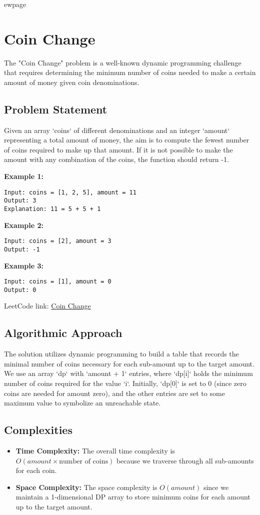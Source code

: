 
ewpage
\chapter{Coin Change}
\label{chap:Coin_Change}
The "Coin Change" problem is a well-known dynamic programming challenge that requires determining the minimum number of coins needed to make a certain amount of money given coin denominations.

\section*{Problem Statement}
Given an array `coins` of different denominations and an integer `amount` representing a total amount of money, the aim is to compute the fewest number of coins required to make up that amount. If it is not possible to make the amount with any combination of the coins, the function should return -1.

\textbf{Example 1:}
\begin{verbatim}
Input: coins = [1, 2, 5], amount = 11
Output: 3
Explanation: 11 = 5 + 5 + 1
\end{verbatim}

\textbf{Example 2:}
\begin{verbatim}
Input: coins = [2], amount = 3
Output: -1
\end{verbatim}

\textbf{Example 3:}
\begin{verbatim}
Input: coins = [1], amount = 0
Output: 0
\end{verbatim}

LeetCode link: \href{https://leetcode.com/problems/coin-change/}{Coin Change}

\section*{Algorithmic Approach}
The solution utilizes dynamic programming to build a table that records the minimal number of coins necessary for each sub-amount up to the target amount. We use an array `dp` with `amount + 1` entries, where `dp[i]` holds the minimum number of coins required for the value `i`. Initially, `dp[0]` is set to 0 (since zero coins are needed for amount zero), and the other entries are set to some maximum value to symbolize an unreachable state.

\section*{Complexities}
\begin{itemize}
	\item \textbf{Time Complexity:} The overall time complexity is \(O(amount \times \text{number of coins})\) because we traverse through all sub-amounts for each coin.
	\item \textbf{Space Complexity:} The space complexity is \(O(amount)\) since we maintain a 1-dimensional DP array to store minimum coins for each amount up to the target amount.
\end{itemize}


